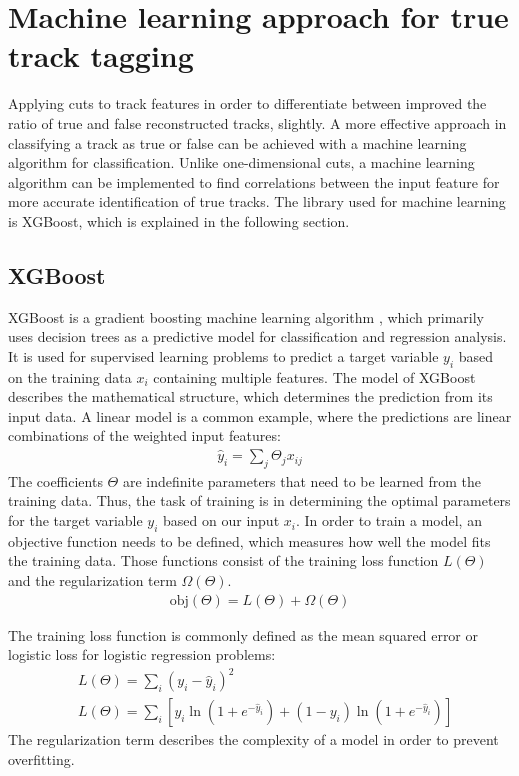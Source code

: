 \chapter{Machine learning approach for true track tagging}
Applying cuts to track features in order to differentiate between improved the ratio of true and false reconstructed tracks, slightly. A more effective
approach in classifying a track as true or false can be achieved with a machine learning algorithm for classification. Unlike one-dimensional cuts, a machine learning
algorithm can be implemented to find correlations between the input feature for more accurate identification of true tracks. The library used for
machine learning is XGBoost, which is explained in the following section.

\section{XGBoost}
XGBoost \cite{xgboost} is a gradient boosting machine learning algorithm \cite{gradient}, which primarily uses decision trees as a predictive model for classification and regression analysis.
It is used for supervised learning problems to predict a target variable $y_i$ based on the training data $x_i$ containing multiple features. The model
of XGBoost describes the mathematical structure, which determines the prediction from its input data. A linear model is a common example, where the predictions
are linear combinations of the weighted input features:
\begin{align}
  \hat{y}_i = \sum_j \Theta_j x_{ij}
\end{align}
The coefficients $\Theta$ are indefinite parameters that need to be learned from the training data. Thus, the task of training is in determining the optimal parameters
for the target variable $y_i$ based on our input $x_i$. In order to train a model, an objective function needs to be defined, which measures how well
the model fits the training data. Those functions consist of the training loss function $L(\Theta) $ and the regularization term $\Omega (\Theta)$.
\begin{align}
  \text{obj}(\Theta) = L(\Theta) + \Omega(\Theta)
\end{align}

The training loss function is commonly defined as the mean squared error or logistic loss for logistic regression problems:
\begin{align}
  &L(\Theta) = \sum_i (y_i - \hat{y}_i)^2 \\
  &L(\Theta) = \sum_i [y_i \ln{(1 + e^{-\hat{y}_i})} + (1 - y_i) \ln{(1 + e^{-\hat{y}_i})}]
\end{align}
The regularization term describes the complexity of a model in order to prevent overfitting.

